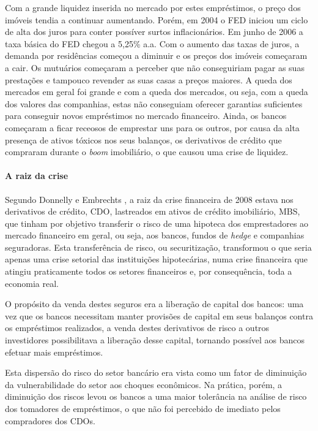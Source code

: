 \documentclass[
	12pt,				%
	oneside,			%
	a4paper,			%
	chapter=TITLE,		%
	section=TITLE,		%
	english,			%
	brazil				%
	]{abntex2}
\begin{document}
Com a grande liquidez inserida no mercado por estes empréstimos, o preço
dos imóveis tendia a continuar aumentando. Porém, em 2004 o \gls{FED}
iniciou um ciclo de alta dos juros para conter possíver surtos
inflacionários. Em junho de 2006 a taxa básica do \gls{FED} chegou a
5,25\% a.a. Com o aumento das taxas de juros, a demanda por residências
começou a diminuir e os preços dos imóveis começaram a cair. Os
mutuários começaram a perceber que não conseguiriam pagar as suas
prestações e tampouco revender as suas casas a preços maiores. A queda
dos mercados em geral foi grande e com a queda dos mercados, ou seja,
com a queda dos valores das companhias, estas não conseguiam oferecer
garantias suficientes para conseguir novos empréstimos no mercado
financeiro. Ainda, os bancos começaram a ficar receosos de emprestar uns
para os outros, por causa da alta presença de ativos tóxicos nos seus
balanços, os derivativos de crédito que compraram durante o \emph{boom}
imobiliário, o que causou uma crise de liquidez.

\paragraph{A raiz da crise}\label{a-raiz-da-crise}

Segundo Donnelly e Embrechts \autocite*[3]{devil}, a raiz da crise
financeira de 2008 estava nos derivativos de crédito, \gls{CDO},
lastreados em ativos de crédito imobiliário, \gls{MBS}, que tinham por
objetivo transferir o risco de uma hipoteca dos emprestadores ao mercado
financeiro em geral, ou seja, aos bancos, fundos de \emph{hedge} e
companhias seguradoras. Esta transferência de risco, ou securitização,
transformou o que seria apenas uma crise setorial das instituições
hipotecárias, numa crise financeira que atingiu praticamente todos os
setores financeiros e, por consequência, toda a economia real.

O propósito da venda destes seguros era a liberação de capital dos
bancos: uma vez que os bancos necessitam manter provisões de capital em
seus balanços contra os empréstimos realizados, a venda destes
derivativos de risco a outros investidores possibilitava a liberação
desse capital, tornando possível aos bancos efetuar mais empréstimos.

Esta dispersão do risco do setor bancário era vista como um fator de
diminuição da vulnerabilidade do setor aos choques econômicos. Na
prática, porém, a diminuição dos riscos levou os bancos a uma maior
tolerância na análise de risco dos tomadores de empréstimos, o que não
foi percebido de imediato pelos compradores dos \gls{CDO}s.
\end{document}
